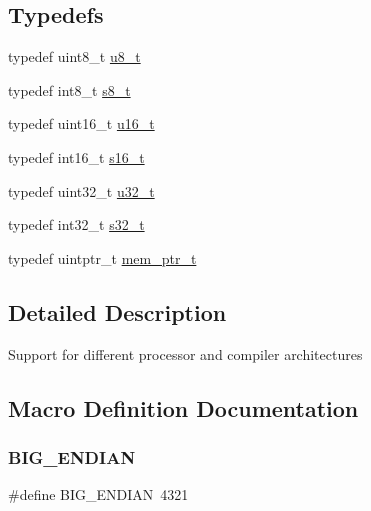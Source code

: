 \subsection*{Typedefs}
\begin{DoxyCompactItemize}
\item 
typedef uint8\+\_\+t \hyperlink{group__compiler__abstraction_ga4caecabca98b43919dd11be1c0d4cd8e}{u8\+\_\+t}
\item 
typedef int8\+\_\+t \hyperlink{group__compiler__abstraction_ga9cd1d7891fe315de1201e2c6e45f4f57}{s8\+\_\+t}
\item 
typedef uint16\+\_\+t \hyperlink{group__compiler__abstraction_ga77570ac4fcab86864fa1916e55676da2}{u16\+\_\+t}
\item 
typedef int16\+\_\+t \hyperlink{group__compiler__abstraction_gacf46f4df0ebab84edebcb69967fdf86b}{s16\+\_\+t}
\item 
typedef uint32\+\_\+t \hyperlink{group__compiler__abstraction_ga4c14294869aceba3ef9d4c0c302d0f33}{u32\+\_\+t}
\item 
typedef int32\+\_\+t \hyperlink{group__compiler__abstraction_ga10f9a3d7baef58ccc23228c3bd29c1fb}{s32\+\_\+t}
\item 
typedef uintptr\+\_\+t \hyperlink{group__compiler__abstraction_gaf019cbb71af10dcfda7758b21e655307}{mem\+\_\+ptr\+\_\+t}
\end{DoxyCompactItemize}


\subsection{Detailed Description}
Support for different processor and compiler architectures 

\subsection{Macro Definition Documentation}
\mbox{\label{openmote-cc2538_2lwip_2src_2include_2lwip_2arch_8h_a23eb5e058a210efdde3d64e69679fafa}} 
\subsubsection{\texorpdfstring{B\+I\+G\+\_\+\+E\+N\+D\+I\+AN}{BIG\_ENDIAN}}
{\footnotesize\ttfamily \#define B\+I\+G\+\_\+\+E\+N\+D\+I\+AN~4321}

